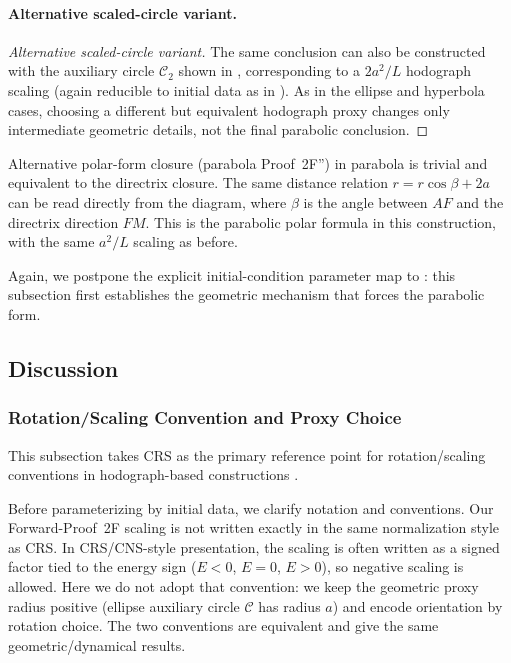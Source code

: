 \paragraph{Alternative scaled-circle variant.}
\begin{proof}[Alternative scaled-circle variant]
The same conclusion can also be constructed with the auxiliary circle \(\mathcal C_2\) shown in , corresponding to a \(2a^2/L\) hodograph scaling (again reducible to initial data as in ). As in the ellipse and hyperbola cases, choosing a different but equivalent hodograph proxy changes only intermediate geometric details, not the final parabolic conclusion.
\end{proof}

Alternative polar-form closure (parabola Proof~2F'') in parabola is trivial and equivalent to the directrix closure. The same distance relation \(r=r\cos\beta+2a\) can be read directly from the diagram, where \(\beta\) is the angle between \(AF\) and the directrix direction \(FM\). This is the parabolic polar formula in this construction, with the same \(a^2/L\) scaling as before.

Again, we postpone the explicit initial-condition parameter map to : this subsection first establishes the geometric mechanism that forces the parabolic form.

\subsection{Discussion}
\label{subsec:proof2f-discussion}

\subsubsection{Rotation/Scaling Convention and Proxy Choice}

This subsection takes CRS as the primary reference point for rotation/scaling conventions in hodograph-based constructions \cite{carinena2016newlook}.

Before parameterizing by initial data, we clarify notation and conventions. Our Forward-Proof~2F scaling is not written exactly in the same normalization style as CRS. In CRS/CNS-style presentation, the scaling is often written as a signed factor tied to the energy sign (\(E<0\), \(E=0\), \(E>0\)), so negative scaling is allowed. Here we do not adopt that convention: we keep the geometric proxy radius positive (ellipse auxiliary circle \(\mathcal C\) has radius \(a\)) and encode orientation by rotation choice. The two conventions are equivalent and give the same geometric/dynamical results.

